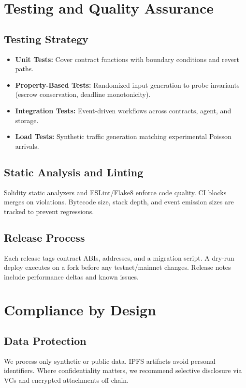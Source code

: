 \section{Testing and Quality Assurance}

\subsection{Testing Strategy}
\begin{itemize}
    \item \textbf{Unit Tests:} Cover contract functions with boundary conditions and revert paths.
    \item \textbf{Property-Based Tests:} Randomized input generation to probe invariants (escrow conservation, deadline monotonicity).
    \item \textbf{Integration Tests:} Event-driven workflows across contracts, agent, and storage.
    \item \textbf{Load Tests:} Synthetic traffic generation matching experimental Poisson arrivals.
\end{itemize}

\subsection{Static Analysis and Linting}
Solidity static analyzers and ESLint/Flake8 enforce code quality. CI blocks merges on violations. Bytecode size, stack depth, and event emission sizes are tracked to prevent regressions.

\subsection{Release Process}
Each release tags contract ABIs, addresses, and a migration script. A dry-run deploy executes on a fork before any testnet/mainnet changes. Release notes include performance deltas and known issues.

\section{Compliance by Design}

\subsection{Data Protection}
We process only synthetic or public data. IPFS artifacts avoid personal identifiers. Where confidentiality matters, we recommend selective disclosure via VCs and encrypted attachments off-chain.


